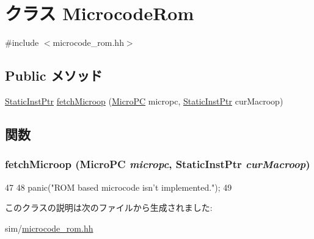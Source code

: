 \hypertarget{classMicrocodeRom}{
\section{クラス MicrocodeRom}
\label{classMicrocodeRom}
}


{\ttfamily \#include $<$microcode\_\-rom.hh$>$}\subsection*{Public メソッド}
\begin{DoxyCompactItemize}
\item 
\hyperlink{classRefCountingPtr}{StaticInstPtr} \hyperlink{classMicrocodeRom_a7d5ea9c7d3f30d2acf072f3037d5c644}{fetchMicroop} (\hyperlink{base_2types_8hh_adfb4d8b20c5abc8be73dd367b16f2d57}{MicroPC} micropc, \hyperlink{classRefCountingPtr}{StaticInstPtr} curMacroop)
\end{DoxyCompactItemize}


\subsection{関数}
\hypertarget{classMicrocodeRom_a7d5ea9c7d3f30d2acf072f3037d5c644}{
\subsubsection[{fetchMicroop}]{ fetchMicroop ({\bf MicroPC} {\em micropc}, \/  {\bf StaticInstPtr} {\em curMacroop})}}
\label{classMicrocodeRom_a7d5ea9c7d3f30d2acf072f3037d5c644}



\begin{DoxyCode}
47     {
48         panic("ROM based microcode isn't implemented.\n");
49     }
\end{DoxyCode}


このクラスの説明は次のファイルから生成されました:\begin{DoxyCompactItemize}
\item 
sim/\hyperlink{sim_2microcode__rom_8hh}{microcode\_\-rom.hh}\end{DoxyCompactItemize}

